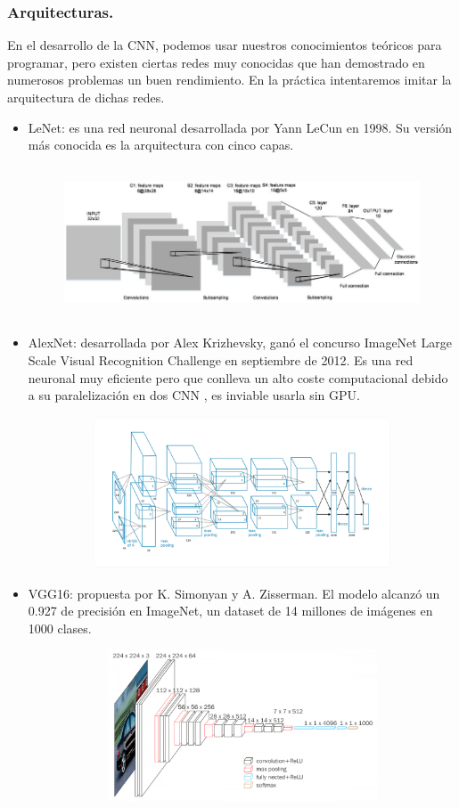 \documentclass[a4paper,10pt]{article}
\begin{document}
\subsubsection{Arquitecturas.}
En el desarrollo de la CNN, podemos usar nuestros conocimientos teóricos para programar, pero existen ciertas redes muy conocidas que han demostrado en numerosos problemas un buen rendimiento. En la práctica intentaremos imitar la arquitectura de dichas redes.
\begin{itemize}
\item LeNet: es una red neuronal desarrollada por Yann LeCun en 1998. Su versión más conocida es la arquitectura con cinco capas. \begin{figure}[H]
\centering
\includegraphics[width=14.0cm, height=4.5cm]{lenet5.png}
\end{figure}
\item AlexNet: desarrollada por Alex Krizhevsky, ganó el concurso ImageNet Large Scale Visual Recognition Challenge en septiembre de 2012. Es una red neuronal muy eficiente pero que conlleva un alto coste computacional debido a su paralelización en dos CNN , es inviable usarla sin GPU.\begin{figure}[H]
\centering
\includegraphics[width=14.0cm, height=4.5cm]{AlexNet2012.png}
\end{figure}
\item VGG16: propuesta por K. Simonyan y A. Zisserman. El modelo alcanzó un 0.927 de precisión en ImageNet, un dataset de 14 millones de imágenes en 1000 clases. \begin{figure}[H]
\centering
\includegraphics[width=12.0cm, height=4.5cm]{vgg16-1-e1542731207177.png}

\end{figure}
\end{itemize}
\end{document}
